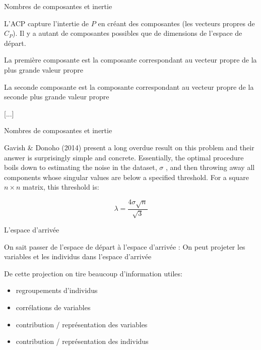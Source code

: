 \documentclass{beamer}
\begin{document}
\begin{frame}{Nombres de composantes et inertie}

L'ACP capture l'intertie de $P$ en créant des composantes (les vecteurs propres de  $C_P$). 
Il y a autant de composantes possibles que de dimensions de l'espace de départ. 


La première composante est la composante correspondant au vecteur propre de la plus grande valeur propre

La seconde composante est la composante correspondant au vecteur propre de la seconde plus grande valeur propre 

[...]



\end{frame}




\begin{frame}{Nombres de composantes et inertie}


Gavish \& Donoho (2014) present a long overdue result on this problem and their answer is surprisingly simple and concrete. Essentially, the optimal procedure boils down to estimating the noise in the dataset, $\sigma$ , and then throwing away all components whose singular values are below a specified threshold. For a square $n \times n$  matrix, this threshold is:

$$\lambda = \frac{4 \sigma \sqrt{n}}{\sqrt{3}}$$


\end{frame}


\begin{frame}{L'espace d'arrivée}

On sait passer de l'espace de départ à l'espace d'arrivée : 
On peut \alert{projeter} les variables et les individus dans l'espace d'arrivée

\medskip

De cette projection on tire beaucoup d'information utiles: 


\begin{itemize}
\item regroupements d'individus
\item corrélations de variables
\item contribution / représentation  des variables 
\item contribution / représentation des individus 
\end{itemize}
\end{frame}
\end{document}
